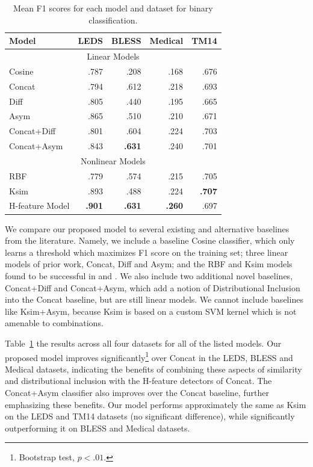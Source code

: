 \begin{table}
\centering
\begin{tabular}{|l|rrrr|}
  \hline
  {\bf Model}      & {\bf LEDS}  & {\bf BLESS} & {\bf Medical} & {\bf TM14}  \\
  \hline
  \hline
  \multicolumn{5}{|c|}{Linear Models}\\
  \hline
  Cosine           &      .787   &      .208   &      .168     &      .676   \\
  Concat           &      .794   &      .612   &      .218     &      .693   \\
  Diff             &      .805   &      .440   &      .195     &      .665   \\
  Asym             &      .865   &      .510   &      .210     &      .671   \\
  Concat+Diff      &      .801   &      .604   &      .224     &      .703   \\
  Concat+Asym      &      .843   &  {\bf.631}  &      .240     &      .701   \\
  \hline
  \multicolumn{5}{|c|}{Nonlinear Models}\\
  \hline
  RBF              &      .779   &      .574   &      .215     &      .705   \\
  Ksim             &      .893   &      .488   &      .224     &  {\bf.707}  \\
  H-feature Model  &  {\bf.901}  &  {\bf.631}  &  {\bf.260}    &      .697   \\
  \hline
\end{tabular}
\caption{Mean F1 scores for each model and dataset for binary classification.}
\label{tab:results}
\end{table}

We compare our proposed model to several existing and alternative baselines
from the literature. Namely, we include a baseline Cosine
classifier, which only learns a threshold which maximizes F1 score on the
training set; three linear models of prior work, Concat, Diff and Asym; and the
RBF and Ksim models found to be successful in
 and . We also include two additional
novel baselines, Concat+Diff and Concat+Asym, which add a notion of
Distributional Inclusion into the Concat baseline, but are still linear models.
We cannot include baselines like Ksim+Asym, because Ksim is based on a custom
SVM kernel which is not amenable to combinations.

Table~\ref{tab:results} the results across all four datasets for all of the
listed models. Our proposed model improves significantly\footnote{Bootstrap test, $p<.01$.} over Concat in the LEDS,
BLESS and Medical datasets, indicating the benefits of combining these aspects of
similarity and distributional inclusion with the H-feature detectors of Concat.
The Concat+Asym classifier also improves over the Concat baseline, further
emphasizing these benefits. Our model performs approximately the same as Ksim
on the LEDS and TM14 datasets (no significant difference),
while significantly outperforming it on BLESS and Medical datasets.

